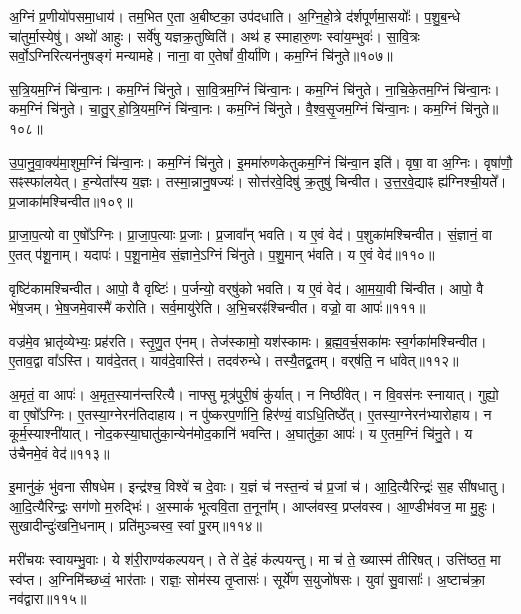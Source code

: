 अ॒ग्निं प्र॒णीयो॑पसमा॒धाय॑। तम॒भित ए॒ता अ॒बीष्टका॒ उप॑दधाति। 
अ॒ग्नि॒हो॒त्रे द॑र्शपूर्णमा॒सयोः᳚। प॒शु॒ब॒न्धे चा॑तुर्मा॒स्येषु॑। 
अथो॑ आहुः। सर्वे॑षु यज्ञक्र॒तुष्विति॑। 
अथ॑ ह स्माहारु॒णः स्वा॑य॒म्भुवः॑। सा॒वि॒त्रः सर्वो॒ऽग्निरित्यन॑नुषङ्गं मन्यामहे। 
नाना॒ वा ए॒तेषां᳚ वी॒र्या॑णि। कम॒ग्निं चि॑नुते॥१०७॥


स॒त्रि॒यम॒ग्निं चि॑न्वा॒नः। कम॒ग्निं चि॑नुते। 
सा॒वि॒त्रम॒ग्निं चि॑न्वा॒नः। कम॒ग्निं चि॑नुते। 
ना॒चि॒के॒तम॒ग्निं चि॑न्वा॒नः। कम॒ग्निं चि॑नुते। 
चा॒तु॒र्‌हो॒त्रि॒य\-म॒ग्निं चि॑न्वा॒नः। कम॒ग्निं चि॑नुते। 
वै॒श्व॒सृ॒जम॒ग्निं चि॑न्वा॒नः। कम॒ग्निं चि॑नुते॥१०८॥


उ॒पा॒नु॒वा॒क्य॑मा॒शुम॒ग्निं चि॑न्वा॒नः। कम॒ग्निं चि॑नुते। 
इ॒म\-मा॑रुण\-केतुक\-म॒ग्निं चि॑न्वा॒न इति॑। वृषा॒ वा अ॒ग्निः। 
वृषा॑णौ॒ सꣴस्फा॑लयेत्। ह॒न्येता᳚स्य य॒ज्ञः। 
तस्मा॒न्नानु॒षज्यः॑। सोत्त॑रवे॒दिषु॑ क्र॒तुषु॑ चिन्वीत। 
उ॒त्त॒र॒वे॒द्याꣴ ह्य॑ग्निश्ची॒यते᳚। प्र॒जाका॑मश्चिन्वीत॥१०९॥


प्रा॒जा॒प॒त्यो वा ए॒षो᳚ऽग्निः। प्रा॒जा॒प॒त्याः प्र॒जाः। 
प्र॒जावा᳚न्‌ भवति। य ए॒वं वेद॑। 
प॒शुका॑मश्चिन्वीत। सं॒ज्ञानं॒ वा ए॒तत् प॑शू॒नाम्। 
यदापः॑। प॒शू॒नामे॒व सं॒ज्ञाने॒ऽग्निं चि॑नुते। 
प॒शु॒मान् भ॑वति। य ए॒वं वेद॑॥११०॥


वृष्टि॑कामश्चिन्वीत। आपो॒ वै वृष्टिः॑। 
प॒र्जन्यो॒ वर्‌षु॑को भवति। य ए॒वं वेद॑। 
आ॒म॒या॒वी चि॑न्वीत। आपो॒ वै भे॑ष॒जम्। 
भे॒ष॒जमे॒वास्मै॑ करोति। सर्व॒मायु॑रेति। 
अ॒भि॒चरꣴ॑श्चिन्वीत। वज्रो॒ वा आपः॑॥१११॥


वज्र॑मे॒व भ्रातृ॑व्येभ्यः॒ प्रह॑रति। स्तृ॒णु॒त ए॑नम्। 
तेज॑स्कामो॒ यश॑स्कामः। ब्र॒ह्म॒व॒र्च॒सका॑मः स्व॒र्गका॑मश्चिन्वीत। 
ए॒ताव॒द्वा वा᳚ऽस्ति। याव॑दे॒तत्। 
याव॑दे॒वास्ति॑। तदव॑रुन्धे। 
तस्यै॒तद्व्र॒तम्। वर्‌ष॑ति॒ न धा॑वेत्॥११२॥


अ॒मृतं॒ वा आपः॑। अ॒मृत॒स्यान॑न्तरित्यै। 
नाफ्सु मूत्र॑पुरी॒षं कु॑र्यात्। न निष्ठी॑वेत्। 
न वि॒वस॑नः स्नायात्। गुह्यो॒ वा ए॒षो᳚ऽग्निः। 
ए॒तस्या॒ग्नेरन॑तिदाहाय। न पु॑ष्करप॒र्णानि॒ हिर॑ण्यं॒ वाऽधि॒तिष्ठे᳚त्। 
ए॒तस्या॒ग्नेरन॑भ्यारोहाय। न कूर्म॒स्याश्नी॑यात्। 
नोद॒कस्या॒घातु॑का॒न्येन॑\-मोद॒कानि॑ भवन्ति। अ॒घातु॑का॒ आपः॑। 
य ए॒तम॒ग्निं चि॑नु॒ते। य उ॑चैनमे॒वं वेद॑॥११३॥\anuvakamend


इ॒मानु॑कं॒ भु॑वना सीषधेम। इन्द्र॑श्च॒ विश्वे॑ च दे॒वाः। 
य॒ज्ञं च॑ नस्त॒न्वं च॑ प्र॒जां च॑। आ॒दि॒त्यैरिन्द्रः॑ स॒ह सी॑षधातु। 
आ॒दि॒त्यैरिन्द्रः॒ सग॑णो म॒रुद्भिः॑। अ॒स्माकं॑ भूत्ववि॒ता त॒नूना᳚म्। 
आप्ल॑वस्व॒ प्रप्ल॑वस्व। आ॒ण्डीभ॑वज॒ मा मु॒हुः। 
सुखादीन्दुः॑खनि॒धनाम्। प्रति॑मुञ्चस्व॒ स्वां पु॒रम्॥११४॥


मरी॑चयः स्वायम्भु॒वाः। ये श॑री॒राण्य॑कल्पयन्। 
ते ते॑ दे॒हं क॑ल्पयन्तु। मा च॑ ते॒ ख्यास्म॑ तीरिषत्। 
उत्ति॑ष्ठत॒ मा स्व॑प्त। अ॒ग्निमि॑च्छध्वं॒ भार॑ताः। 
राज्ञः॒ सोम॑स्य तृ॒प्तासः॑। सूर्ये॑ण स॒युजो॑षसः। 
युवा॑ सु॒वासाः᳚। अ॒ष्टाच॑क्रा॒ नव॑द्वारा॥११५॥


